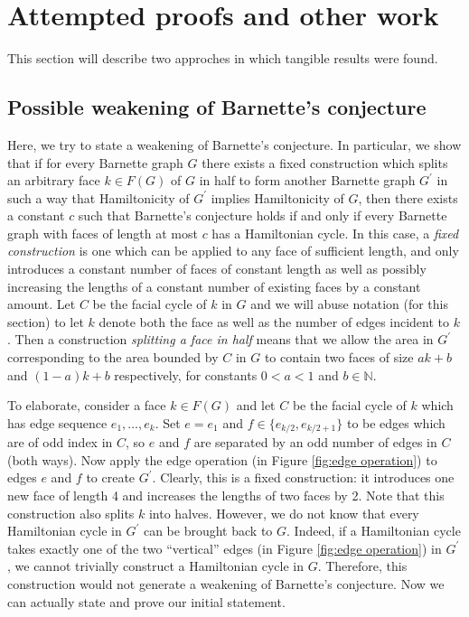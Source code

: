 \documentclass{scrartcl}
\theoremstyle{definition}
\theoremstyle{plain}
\begin{document}
\section*{Attempted proofs and other work}

This section will describe two approches in which tangible results were found.

\subsection*{Possible weakening of Barnette's conjecture}

Here, we try to state a weakening of Barnette's conjecture.
In particular, we show that if for every Barnette graph $G$ there exists a fixed construction which
splits an arbitrary face $k\in F(G)$ of $G$ in half to form another Barnette graph $G^\prime$ in
such a way that Hamiltonicity of $G^\prime$ implies Hamiltonicity of $G$, then there exists a
constant $c$ such that  Barnette's conjecture holds if and only if every Barnette graph with faces
of length at most $c$ has a Hamiltonian cycle.
In this case, a \textit{fixed construction} is one which can be applied to any face of sufficient
length, and only introduces a constant number of faces of constant length as well as possibly
increasing the lengths of a constant number of existing faces by a constant amount.
Let $C$ be the facial cycle of $k$ in $G$ and we will abuse notation (for this section) to let $k$
denote both the face as well as the number of edges incident to $k$.
Then a construction \textit{splitting a face in half} means that we allow the area in $G^\prime$
corresponding to the area bounded by $C$ in $G$ to contain two faces of size $ak+b$ and $(1-a)k+b$
respectively, for constants $0<a<1$ and $b\in\mathbb{N}$.

To elaborate, consider a face $k\in F(G)$ and let $C$ be the facial cycle of $k$ which has edge
sequence $e_1,\dots,e_k$.
Set $e=e_1$ and $f\in\{e_{k/2},e_{k/2+1}\}$ to be edges which are of odd index in $C$, so $e$ and
$f$ are separated by an odd number of edges in $C$ (both ways).
Now apply the edge operation (in Figure \ref{fig:edge operation}) to edges $e$ and $f$ to create
$G^\prime$.
Clearly, this is a fixed construction: it introduces one new face of length 4 and increases the
lengths of two faces by 2.
Note that this construction also splits $k$ into halves.
However, we do not know that every Hamiltonian cycle in $G^\prime$ can be brought back to $G$.
Indeed, if a Hamiltonian cycle takes exactly one of the two ``vertical'' edges (in Figure
\ref{fig:edge operation}) in $G^\prime$, we cannot trivially construct a Hamiltonian cycle in $G$.
Therefore, this construction would not generate a weakening of Barnette's conjecture.
Now we can actually state and prove our initial statement.
\end{document}
